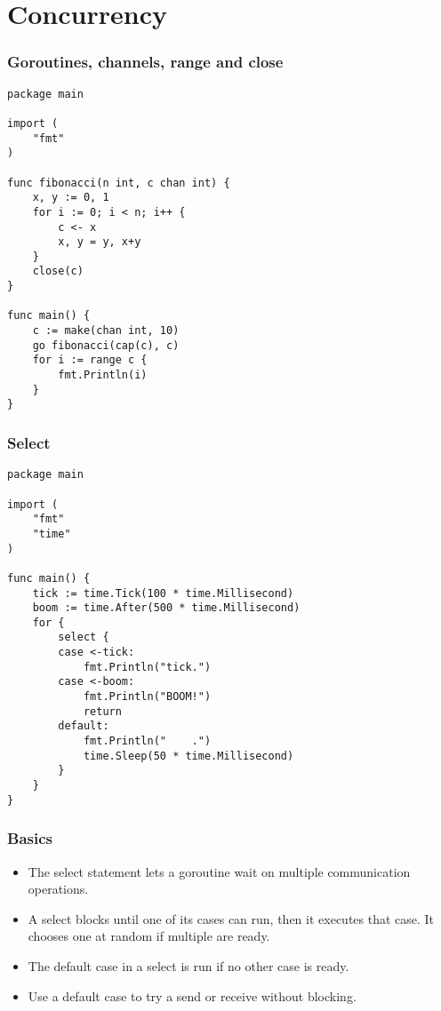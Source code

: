\section{Concurrency}
\begin{frame}[fragile]
\frametitle{Goroutines, channels, range and close}

\begin{lstlisting}
package main

import (
    "fmt"
)

func fibonacci(n int, c chan int) {
    x, y := 0, 1
    for i := 0; i < n; i++ {
        c <- x
        x, y = y, x+y
    }
    close(c)
}

func main() {
    c := make(chan int, 10)
    go fibonacci(cap(c), c)
    for i := range c {
        fmt.Println(i)
    }
}
\end{lstlisting}
\end{frame}


\begin{frame}[fragile]
\frametitle{Select}

\begin{lstlisting}
package main

import (
    "fmt"
    "time"
)

func main() {
    tick := time.Tick(100 * time.Millisecond)
    boom := time.After(500 * time.Millisecond)
    for {
        select {
        case <-tick:
            fmt.Println("tick.")
        case <-boom:
            fmt.Println("BOOM!")
            return
        default:
            fmt.Println("    .")
            time.Sleep(50 * time.Millisecond)
        }
    }
}
\end{lstlisting}
\end{frame}


\begin{frame}
\frametitle{Basics}

\begin{itemize}
	\item  The select statement lets a goroutine wait on multiple communication operations.
	\item A select blocks until one of its cases can run, then it executes that case. It chooses one at random if multiple are ready. 
	\item The default case in a select is run if no other case is ready.
	\item Use a default case to try a send or receive without blocking.
\end{itemize}

\end{frame}


